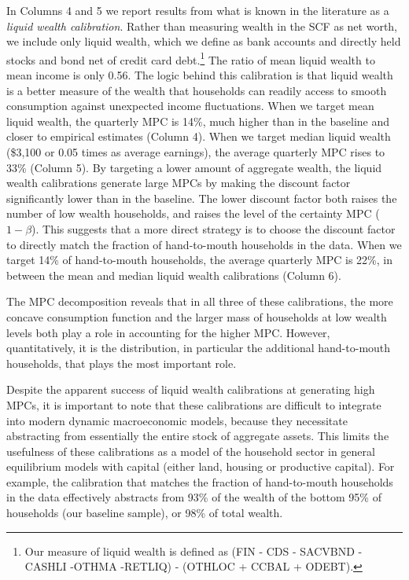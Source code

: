 In Columns 4 and 5 we report results from what is known in the literature as a \emph{liquid wealth calibration}. Rather than measuring wealth in the SCF as net worth, we include only liquid wealth, which we define as bank accounts and directly held stocks and bond net of credit card debt.\footnote{Our measure of liquid wealth is defined as (FIN - CDS - SACVBND - CASHLI -OTHMA -RETLIQ) - (OTHLOC + CCBAL + ODEBT).}
The ratio of mean liquid wealth to mean income is only 0.56. The logic behind this calibration is that liquid wealth is a better measure of the wealth that households can readily access to smooth consumption against unexpected income fluctuations. When we target mean liquid wealth, the quarterly MPC is 14\%, much higher than in the baseline and closer to empirical estimates (Column 4). When we target median liquid wealth (\$3,100 or 0.05 times as average earnings), the average quarterly MPC rises to 33\% (Column 5). By targeting a lower amount of aggregate wealth, the liquid wealth calibrations generate large MPCs by making the discount factor significantly lower than in the baseline. The lower discount factor both raises the number of low wealth households, and raises the level of the certainty MPC ($1-\beta$). This suggests that a more direct strategy is to choose the discount factor to directly match the fraction of hand-to-mouth households in the data. When we target 14\% of hand-to-mouth households, the average quarterly MPC is 22\%, in between the mean and median liquid wealth calibrations (Column 6).

The MPC decomposition reveals that in all three of these calibrations, the more concave consumption function and the larger mass of households at low wealth levels both play a role in accounting for the higher MPC. However, quantitatively, it is the distribution, in particular the additional hand-to-mouth households, that plays the  most important role.

Despite the apparent success of liquid wealth calibrations at generating high MPCs, it is important to note that these calibrations are difficult  to integrate into modern dynamic macroeconomic models, because they necessitate abstracting from essentially the entire stock of aggregate assets. This limits the usefulness of these calibrations as a model of the household sector in general equilibrium models with capital (either land, housing or productive capital). For example, the calibration that matches the fraction of hand-to-mouth households in the data effectively abstracts from 93\% of the wealth of the bottom 95\% of households (our baseline sample), or 98\% of total wealth.

